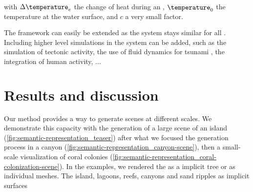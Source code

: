 with $\Delta \temperature_e$ the change of heat during an , $\temperature_0$ the temperature at the water surface, and $c$ a very small factor.

The framework can easily be extended as the  system stays similar for all . Including higher level simulations in the  system can be added, such as the simulation of tectonic activity, the use of fluid dynamics for tsunami , the integration of human activity, ...

\section{Results and discussion}
\label{sec:semantic-representation_results}
Our method provides a way to generate scenes at different scales. We demonstrate this capacity with the generation of a large scene of an island (\cref{fig:semantic-representation_teaser}) after what we focused the generation process in a canyon (\cref{fig:semantic-representation_canyon-scene}), then a small-scale visualization of coral colonies (\cref{fig:semantic-representation_coral-colonization-scene}).
In the examples, we rendered the  as a implicit tree or as individual meshes. The island, lagoons, reefs, canyons and sand ripples as implicit surfaces

